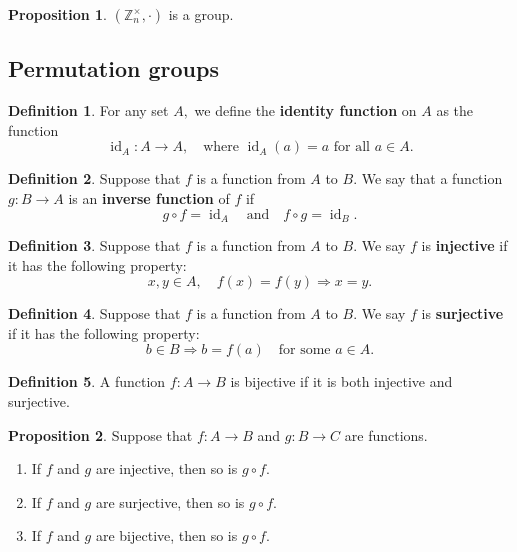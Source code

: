 \documentclass[12pt, a4paper]{article}
\newcommand{\bb}[1]{\mathbb{#1}}
\newcommand{\imply}{\Rightarrow}
\DeclareMathOperator{\id}{id}
\theoremstyle{definition}
\newtheorem{definition}{Definition}[section]
\newtheorem{proposition}{Proposition}
\theoremstyle{plain}
\begin{document}
\begin{proposition}
$(\bb{Z}_n^{\times},\cdot)$ is a group.
\end{proposition}

\subsection{Permutation groups}

\begin{definition}
For any set $A,$ we define the \textbf{identity function} on $A$ as the function
$$\id_A: A\to A, \quad \text{where } \id_A(a)=a \text{ for all } a\in A.$$
\end{definition}

\begin{definition}
Suppose that $f$ is a function from $A$ to $B.$ We say that a function $g : B \to A$ is an \textbf{inverse function} of $f$ if 
$$g\circ f =\id_A \quad \text{and} \quad f \circ g =\id_B.$$
\end{definition}

\begin{definition}
Suppose that $f$ is a function from $A$ to $B.$ We say $f$ is \textbf{injective} if it has the following property: $$x,y\in A, \quad f(x)=f(y) \imply x=y.$$
\end{definition}

\begin{definition}
Suppose that $f$ is a function from $A$ to $B.$ We say $f$ is \textbf{surjective} if it has the following property: $$b\in B \imply b=f(a) \quad \text{for some } a\in A.$$ 
\end{definition}

\begin{definition}
A function $f : A \to B$ is bijective if it is both injective and surjective.
\end{definition}

\begin{proposition}
Suppose that $f : A \to B$ and $g : B \to C$ are functions.
\begin{enumerate}

	\item If $f$ and $g$ are injective, then so is $g\circ f.$

	\item If $f$ and $g$ are surjective, then so is $g\circ f.$

	\item If $f$ and $g$ are bijective, then so is $g\circ f.$

\end{enumerate}
\end{proposition}
\end{document}
